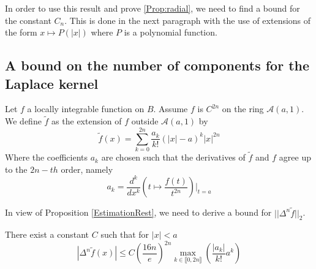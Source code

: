 \documentclass[11pt,a4paper]{article}
\begin{document}
In order to use this result and prove \ref{Prop:radial}, we need to find a bound for the constant $C_n$. This is done in the next paragraph with the use of extensions of the form $x \mapsto P(|x|)$ where $P$ is a polynomial function.

\subsection{A bound on the number of components for the Laplace kernel}

\label{sec:poly}
 
\begin{Def} Let $f$ a locally integrable function on $B$. Assume $f$ is $C^{2n}$ on the ring $\mathcal{A}(a,1)$. We define $\tilde{f}$ as the extension of $f$ outside $\mathcal{A}(a,1)$ by 
\[\tilde{f}(x) = \displaystyle\sum_{k=0}^{2n} \frac{a_k}{k!}(|x|-a)^{k}|x|^{2n}\]
Where the coefficients $a_k$ are chosen such that the derivatives of $\tilde{f}$ and $f$ agree up to the $2n-th$ order, namely 
\[a_k  = \dfrac{d^k }{dx^k}\left(t\mapsto \dfrac{f(t)}{t^{2n}}\right)\Bigr|_{t=a}\] 
\label{ProlongementDef}
\end{Def}

In view of Proposition \ref{EstimationRest}, we need to derive a bound for $||\Delta^n \tilde{f}||_{2}$.

\begin{Lem} 
There exist a constant $C$ such that for $|x|<a$
\begin{equation}
|\Delta^n \tilde{f}(x)| \leq  C\left( \frac{16n}{e}\right)^{2n}\max_{k\in\llbracket 0,2n\rrbracket}\left(\dfrac{|a_k|}{k!}a^k\right)
\label{bigBadEq1Reduced}
\end{equation}
\label{LemAkDeltanf}
\end{Lem}
\end{document}
